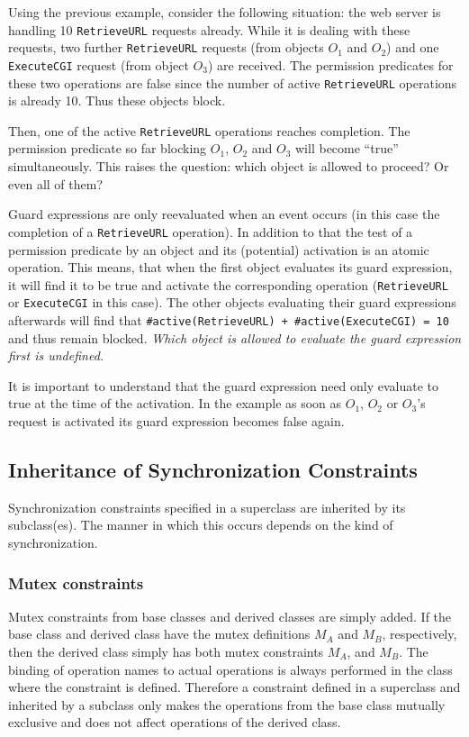 \documentclass[\pformat,12pt]{article}
\begin{document}
Using the previous example, consider the following situation: the web
server is handling 10 \texttt{RetrieveURL} requests already. While it
is dealing with these requests, two further \texttt{RetrieveURL}
requests (from objects $O_1$ and $O_2$) and one \texttt{ExecuteCGI}
request (from object $O_3$) are received. The permission predicates
for these two operations are false since the number of active
\texttt{RetrieveURL} operations is already 10. Thus these objects
block. 

Then, one of the active \texttt{RetrieveURL} operations reaches
completion. The permission predicate so far blocking $O_1$, $O_2$ and
$O_3$ will become ``true'' simultaneously.
This raises the question: which object is allowed to proceed? Or even
all of them? 

Guard expressions are only reevaluated when an event occurs (in this
case the completion of a \texttt{RetrieveURL} operation). In addition to
that the test of a permission predicate by an object and its (potential)
activation is an atomic operation. This means, that when the first
object evaluates its guard expression, it will find it to be true and
activate the corresponding operation (\texttt{RetrieveURL} or
\texttt{ExecuteCGI} in this case). The other objects evaluating their
guard expressions afterwards will find that 
\texttt{\#active(RetrieveURL) + \#active(ExecuteCGI) = 10}
and thus remain blocked. \textit{Which object is allowed to evaluate the guard
expression first is undefined.}

It is important to understand that the guard expression need only 
evaluate to \textsf{true} at the time of the activation. In the
example as soon as $O_1$, $O_2$ or $O_3$'s request is activated its
guard expression becomes false again. 


\subsection{Inheritance of Synchronization Constraints}
\label{ch:sync-inh}

Synchronization constraints specified in a superclass are inherited by
its subclass(es). 
The manner in which this occurs depends on 
the kind of synchronization.

\subsubsection{Mutex constraints}
Mutex constraints from base classes and derived classes are
simply added. If the base class and derived class have the mutex
definitions {$M_{A}$} and {$M_{B}$}, respectively, then the derived
class simply has both mutex constraints {$M_{A}$}, and
{$M_{B}$}. The binding of operation names to actual operations is
always performed in the class where the constraint is
defined. Therefore a  constraint defined in a
superclass and inherited by a subclass only makes the operations from
the base class mutually exclusive and does not affect operations of
the derived class.
\end{document}

